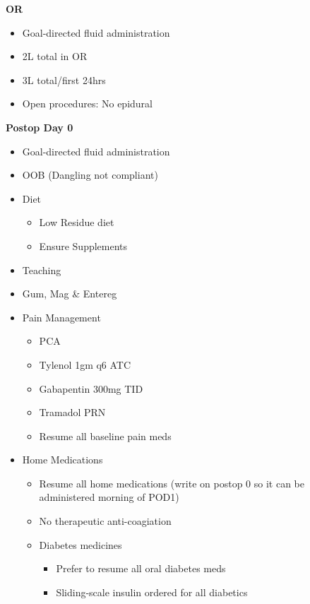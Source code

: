 \documentclass[
  letterpaper,
]{scrbook}
\providecommand{\tightlist}{%
  \setlength{\itemsep}{0pt}\setlength{\parskip}{0pt}}
\begin{document}
\textbf{OR}

\begin{itemize}
\tightlist
\item
  Goal-directed fluid administration
\item
  2L total in OR
\item
  3L total/first 24hrs
\item
  Open procedures: No epidural
\end{itemize}

\textbf{Postop Day 0}

\begin{itemize}
\tightlist
\item
  Goal-directed fluid administration
\item
  OOB (Dangling not compliant)
\item
  Diet

  \begin{itemize}
  \tightlist
  \item
    Low Residue diet
  \item
    Ensure Supplements
  \end{itemize}
\item
  Teaching
\item
  Gum, Mag \& Entereg
\item
  Pain Management

  \begin{itemize}
  \tightlist
  \item
    PCA
  \item
    Tylenol 1gm q6 ATC
  \item
    Gabapentin 300mg TID
  \item
    Tramadol PRN
  \item
    Resume all baseline pain meds
  \end{itemize}
\item
  Home Medications

  \begin{itemize}
  \tightlist
  \item
    Resume all home medications (write on postop 0 so it can be
    administered morning of POD1)
  \item
    No therapeutic anti-coagiation
  \item
    Diabetes medicines

    \begin{itemize}
    \tightlist
    \item
      Prefer to resume all oral diabetes meds
    \item
      Sliding-scale insulin ordered for all diabetics
    \end{itemize}
  \end{itemize}
\end{itemize}
\end{document}
